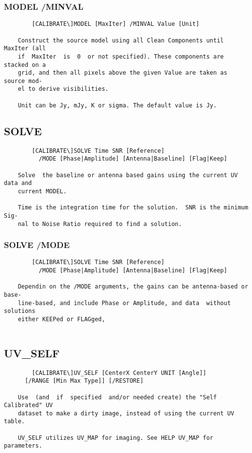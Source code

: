 \subsubsection{MODEL /MINVAL}
\begin{verbatim}
        [CALIBRATE\]MODEL [MaxIter] /MINVAL Value [Unit]

    Construct the source model using all Clean Components until MaxIter (all
    if  MaxIter  is  0  or not specified). These components are stacked on a
    grid, and then all pixels above the given Value are taken as source mod-
    el to derive visibilities.

    Unit can be Jy, mJy, K or sigma. The default value is Jy.

\end{verbatim}
\subsection{SOLVE}
\begin{verbatim}
        [CALIBRATE\]SOLVE Time SNR [Reference]
          /MODE [Phase|Amplitude] [Antenna|Baseline] [Flag|Keep]

    Solve  the baseline or antenna based gains using the current UV data and
    current MODEL.

    Time is the integration time for the solution.  SNR is the minimum  Sig-
    nal to Noise Ratio required to find a solution.

\end{verbatim}
\subsubsection{SOLVE /MODE}
\begin{verbatim}
        [CALIBRATE\]SOLVE Time SNR [Reference]
          /MODE [Phase|Amplitude] [Antenna|Baseline] [Flag|Keep]

    Dependin on the /MODE arguments, the gains can be antenna-based or base-
    line-based, and include Phase or Amplitude, and data  without  solutions
    either KEEPed or FLAGged,


\end{verbatim}
\subsection{UV\_SELF}
\begin{verbatim}
        [CALIBRATE\]UV_SELF [CenterX CenterY UNIT [Angle]]
      [/RANGE [Min Max Type]] [/RESTORE]

    Use  (and  if  specified  and/or needed create) the "Self Calibrated" UV
    dataset to make a dirty image, instead of using the current UV table.

    UV_SELF utilizes UV_MAP for imaging. See HELP UV_MAP for parameters.

\end{verbatim}
